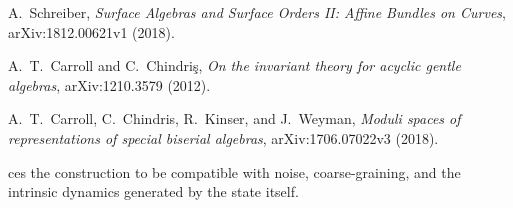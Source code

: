 \documentclass[11pt,oneside]{amsbook}
\numberwithin{equation}{section}
\theoremstyle{plain}
\theoremstyle{definition}
\theoremstyle{remark}
\begin{document}
A.~Schreiber,
\newblock \emph{Surface Algebras and Surface Orders II: Affine Bundles on Curves},
\newblock arXiv:1812.00621v1 (2018).


A.~T.~Carroll and C.~Chindri\c{s},
\newblock \emph{On the invariant theory for acyclic gentle algebras},
\newblock arXiv:1210.3579 (2012).

A.~T.~Carroll, C.~Chindris, R.~Kinser, and J.~Weyman,
\newblock \emph{Moduli spaces of representations of special biserial algebras},
\newblock arXiv:1706.07022v3 (2018).


ces the construction to be compatible with noise, coarse-graining, and the intrinsic dynamics generated by the state itself.
\end{document}
